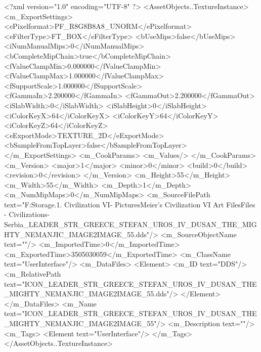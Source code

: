 <?xml version="1.0" encoding="UTF-8" ?>
<AssetObjects..TextureInstance>
	<m_ExportSettings>
		<ePixelformat>PF_R8G8B8A8_UNORM</ePixelformat>
		<eFilterType>FT_BOX</eFilterType>
		<bUseMips>false</bUseMips>
		<iNumManualMips>0</iNumManualMips>
		<bCompleteMipChain>true</bCompleteMipChain>
		<fValueClampMin>0.000000</fValueClampMin>
		<fValueClampMax>1.000000</fValueClampMax>
		<fSupportScale>1.000000</fSupportScale>
		<fGammaIn>2.200000</fGammaIn>
		<fGammaOut>2.200000</fGammaOut>
		<iSlabWidth>0</iSlabWidth>
		<iSlabHeight>0</iSlabHeight>
		<iColorKeyX>64</iColorKeyX>
		<iColorKeyY>64</iColorKeyY>
		<iColorKeyZ>64</iColorKeyZ>
		<eExportMode>TEXTURE_2D</eExportMode>
		<bSampleFromTopLayer>false</bSampleFromTopLayer>
	</m_ExportSettings>
	<m_CookParams>
		<m_Values/>
	</m_CookParams>
	<m_Version>
		<major>1</major>
		<minor>0</minor>
		<build>0</build>
		<revision>0</revision>
	</m_Version>
	<m_Height>55</m_Height>
	<m_Width>55</m_Width>
	<m_Depth>1</m_Depth>
	<m_NumMipMaps>0</m_NumMipMaps>
	<m_SourceFilePath text="F:\Mod Storage\2.1. Civilization VI\Mods\Archive - Pictures\Sid Meier's Civilization VI Art Files\Art Files - Civilizations\Civilization - Serbia\ICON_LEADER_STR_GREECE_STEFAN_UROS_IV_DUSAN_THE_MIGHTY_NEMANJIC_IMAGE2IMAGE_55.dds"/>
	<m_SourceObjectName text=""/>
	<m_ImportedTime>0</m_ImportedTime>
	<m_ExportedTime>3505030059</m_ExportedTime>
	<m_ClassName text="UserInterface"/>
	<m_DataFiles>
		<Element>
			<m_ID text="DDS"/>
			<m_RelativePath text="ICON_LEADER_STR_GREECE_STEFAN_UROS_IV_DUSAN_THE_MIGHTY_NEMANJIC_IMAGE2IMAGE_55.dds"/>
		</Element>
	</m_DataFiles>
	<m_Name text="ICON_LEADER_STR_GREECE_STEFAN_UROS_IV_DUSAN_THE_MIGHTY_NEMANJIC_IMAGE2IMAGE_55"/>
	<m_Description text=""/>
	<m_Tags>
		<Element text="UserInterface"/>
	</m_Tags>
</AssetObjects..TextureInstance>

